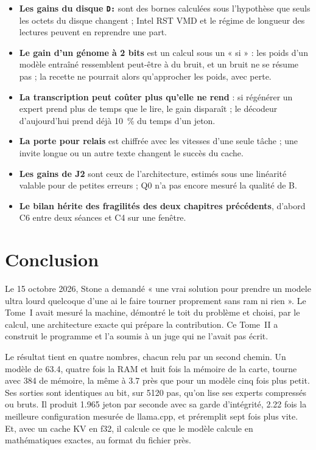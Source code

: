 \begin{faux}
\begin{itemize}
\item \textbf{Les gains du disque \texttt{D:}} sont des bornes calculées sous l'hypothèse que seuls les octets du disque changent ; Intel RST VMD et le régime de longueur des lectures peuvent en reprendre une part.
\item \textbf{Le gain d'un génome à 2 bits} est un calcul sous un « si » : les poids d'un modèle entraîné ressemblent peut-être à du bruit, et un bruit ne se résume pas ; la recette ne pourrait alors qu'approcher les poids, avec perte.
\item \textbf{La transcription peut coûter plus qu'elle ne rend} : si régénérer un expert prend plus de temps que le lire, le gain disparaît ; le décodeur d'aujourd'hui prend déjà \SI{10}{\percent} du temps d'un jeton.
\item \textbf{La porte pour relais} est chiffrée avec les vitesses d'une seule tâche ; une invite longue ou un autre texte changent le succès du cache.
\item \textbf{Les gains de J2} sont ceux de l'architecture, estimés sous une linéarité valable pour de petites erreurs ; Q0 n'a pas encore mesuré la qualité de B.
\item \textbf{Le bilan hérite des fragilités des deux chapitres précédents}, d'abord C6 entre deux séances et C4 sur une fenêtre.
\end{itemize}
\end{faux}

\chapter*{Conclusion}\label{t2d-ch:conclusion}

Le 15 octobre 2026, Stone a demandé « une vrai solution pour prendre un modele ultra lourd quelcoque d'une ai le faire tourner proprement sans ram ni rien ». Le Tome~I avait mesuré la machine, démontré le toit du problème et choisi, par le calcul, une architecture exacte qui prépare la contribution. Ce Tome~II a construit le programme et l'a soumis à un juge qui ne l'avait pas écrit.

Le résultat tient en quatre nombres, chacun relu par un second chemin. Un modèle de \SI{63.4}{\Go}, quatre fois la RAM et huit fois la mémoire de la carte, tourne avec \SI{384}{\Mo} de mémoire, la même à \SI{3.7}{\Mo} près que pour un modèle cinq fois plus petit. Ses sorties sont identiques au bit, sur \num{5120} pas, qu'on lise ses experts compressés ou bruts. Il produit \num{1.965} jeton par seconde avec sa garde d'intégrité, \num{2.22} fois la meilleure configuration mesurée de llama.cpp, et préremplit sept fois plus vite. Et, avec un cache KV en f32, il calcule ce que le modèle calcule en mathématiques exactes, au format du fichier près.

